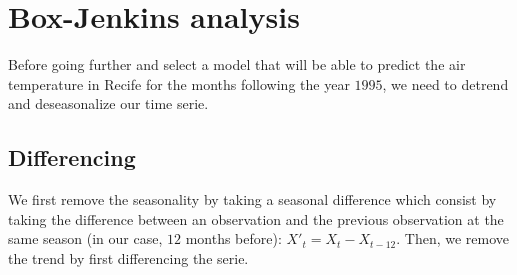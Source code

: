 \section{Box-Jenkins analysis} 

Before going further and select a model that will be able to predict the air temperature in Recife for the months following the year $1995$, we need to detrend and deseasonalize our time serie. 


\subsection[short]{Differencing}

We first remove the seasonality by taking a seasonal difference which consist by taking the difference between an observation and the previous observation at the same season (in our case, $12$ months before): $X'_t = X_t - X_{t-12}$. 
Then, we remove the trend by first differencing the serie.

